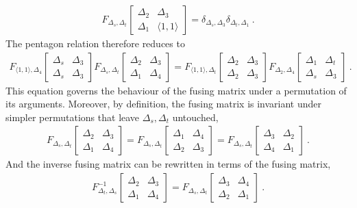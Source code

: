 \documentclass[12pt, a4paper, notitlepage, twoside]{report}
\numberwithin{equation}{section}
\theoremstyle{break}
\begin{document}
\begin{align}
 F_{\Delta_s,\Delta_t}\begin{bmatrix} \Delta_2 & \Delta_3 \\ \Delta_1 & \langle 1,1\rangle \end{bmatrix} = \delta_{\Delta_s,\Delta_3}\delta_{\Delta_t,\Delta_1}\ .
\end{align}
The pentagon relation therefore reduces to 
\begin{align}
 F_{\langle 1,1\rangle, \Delta_{4}} \begin{bmatrix} \Delta_s & \Delta_3\\ \Delta_s & \Delta_3\end{bmatrix} 
 F_{\Delta_s,\Delta_t}\begin{bmatrix} \Delta_2 & \Delta_3 \\ \Delta_1 & \Delta_4 \end{bmatrix} = 
 F_{\langle 1,1\rangle, \Delta_{t}} \begin{bmatrix} \Delta_2 & \Delta_3\\ \Delta_2 & \Delta_3\end{bmatrix}
 F_{\Delta_2,\Delta_4}\begin{bmatrix} \Delta_1 & \Delta_t \\ \Delta_s & \Delta_3 \end{bmatrix}\ .
\end{align}
This equation governs the behaviour of the fusing matrix under a permutation of its arguments.
Moreover, by definition, the fusing matrix is invariant under simpler permutations that leave $\Delta_s, \Delta_t$ untouched,
\begin{align}
 F_{\Delta_s,\Delta_t}\begin{bmatrix} \Delta_2 & \Delta_3 \\ \Delta_1 & \Delta_4 \end{bmatrix} = 
 F_{\Delta_s,\Delta_t}\begin{bmatrix}\Delta_1 & \Delta_4 \\  \Delta_2 & \Delta_3  \end{bmatrix} =
 F_{\Delta_s,\Delta_t}\begin{bmatrix} \Delta_3 & \Delta_2 \\ \Delta_4 & \Delta_1 \end{bmatrix}  \ .
 \end{align}
 And the inverse fusing matrix can be rewritten in terms of the fusing matrix,
 \begin{align}
 F^{-1}_{\Delta_t,\Delta_s}\begin{bmatrix} \Delta_2 & \Delta_3 \\ \Delta_1 & \Delta_4 \end{bmatrix} = 
 F_{\Delta_s,\Delta_t}\begin{bmatrix} \Delta_3 & \Delta_4 \\ \Delta_2 & \Delta_1 \end{bmatrix} \ .
\end{align}
\end{document}
